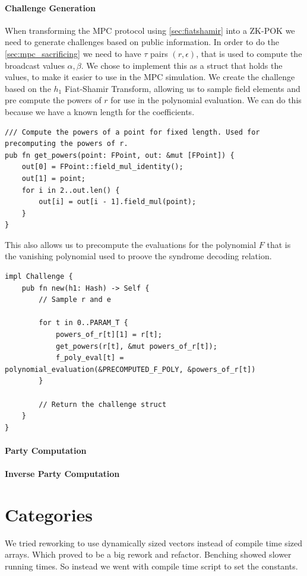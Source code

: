 \documentclass[11pt]{report}
\theoremstyle{definition}
\theoremstyle{plain}
\begin{document}
\paragraph{Challenge Generation}
When transforming the MPC protocol using \autoref{sec:fiatshamir} into a ZK-POK we need to generate challenges based on public information. In order to do the \autoref{sec:mpc_sacrificing} we need to have $\tau$ pairs $(r, \epsilon)$, that is used to compute the broadcast values $\alpha, \beta$.
We chose to implement this as a struct that holds the values, to make it easier to use in the MPC simulation. We create the challenge based on the $h_1$ Fiat-Shamir Transform, allowing us to sample field elements and pre compute the powers of $r$ for use in the polynomial evaluation. We can do this because we have a known length for the coefficients.
\begin{verbatim}
/// Compute the powers of a point for fixed length. Used for precomputing the powers of r.
pub fn get_powers(point: FPoint, out: &mut [FPoint]) {
    out[0] = FPoint::field_mul_identity();
    out[1] = point;
    for i in 2..out.len() {
        out[i] = out[i - 1].field_mul(point);
    }
}
\end{verbatim}
This also allows us to precompute the evaluations for the polynomial $F$ that is the vanishing polynomial used to proove the syndrome decoding relation. 
\begin{verbatim}
impl Challenge {
    pub fn new(h1: Hash) -> Self {
        // Sample r and e

        for t in 0..PARAM_T {
            powers_of_r[t][1] = r[t];
            get_powers(r[t], &mut powers_of_r[t]);
            f_poly_eval[t] = polynomial_evaluation(&PRECOMPUTED_F_POLY, &powers_of_r[t])
        }

        // Return the challenge struct
    }
}
\end{verbatim}


\paragraph{Party Computation}


\paragraph{Inverse Party Computation}

\section{Categories}\label{sub:categories} %
We tried reworking to use dynamically sized vectors instead of compile time sized arrays. Which proved to be a big rework and refactor. Benching showed slower running times. So instead we went with compile time script to set the constants.
\end{document}
